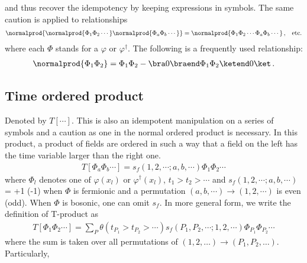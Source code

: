 and thus recover the idempotency by keeping expressions in symbols.
The same caution is applied to relationships
\begin{eqnarray}
\normalprod{\normalprod{\Phi_1 \Phi_2 \cdots}\normalprod{\Phi_a \Phi_b \cdots}}
= \normalprod{\Phi_1 \Phi_2 \cdots \Phi_a \Phi_b \cdots }\,,
\hspace{3mm}
\mbox{etc.}
\end{eqnarray}
where each $\Phi$ stands for a $\varphi$ or $\varphi^\dagger$.
The following is a frequently used relationship:
\begin{eqnarray}
\normalprod{\Phi_1 \Phi_2} = \Phi_1 \Phi_2 -
\bra 0 \braend \Phi_1 \Phi_2 \ketend 0 \ket\,.
\end{eqnarray}
\subsection{Time ordered product}
Denoted by $T[\cdots]$.
This is also an idempotent manipulation on a series of symbols 
and a caution as one in the normal ordered product is necessary.
In this product, a product of fields are ordered in such a way that
a field on the left has the time variable larger than the right one.
\begin{eqnarray}
T[\Phi_a \Phi_b \cdots] = s_f(1,2,\cdots;a,b,\cdots) \Phi_1 \Phi_2 \cdots
\end{eqnarray}
where $\Phi_l$ denotes one of $\varphi(x_l)$ or $\varphi^\dagger(x_l)$,
$t_1 > t_2 > \cdots$ and 
$s_f(1,2,\cdots;a,b,\cdots)$ = +1 (-1) when $\Phi$ is fermionic and
a permutation $(a,b,\cdots) \to (1, 2, \cdots)$ is even (odd).
When $\Phi$ is bosonic, one can omit $s_f$.
In more general form, we write the definition of T-product as
\begin{eqnarray}
T[\Phi_1 \Phi_2 \cdots] =
\sum_{P} \theta(t_{P_1} > t_{P_2} > \cdots) 
s_f(P_1, P_2, \cdots; 1, 2, \cdots)
\Phi_{P_1} \Phi_{P_2} \cdots 
\end{eqnarray}
where the sum is taken over all permutations of $(1, 2, \dots) \to (P_1,P_2, \dots)$.
Particularly, 
